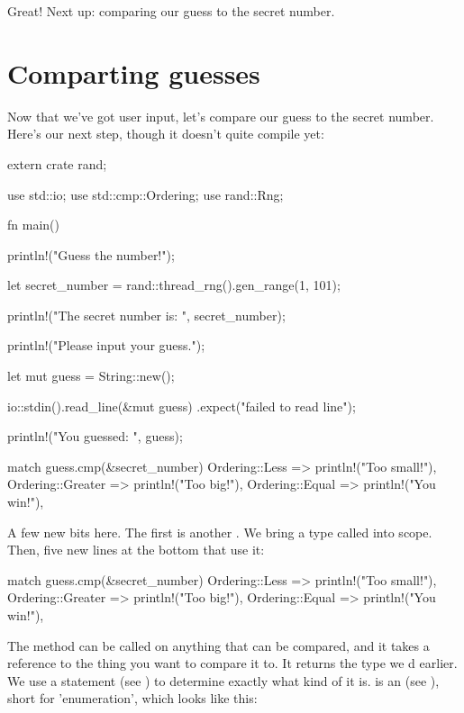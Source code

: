 Great! Next up: comparing our guess to the secret number.

\section{Comparting guesses}

Now that we've got user input, let's compare our guess to the secret number. Here's our next step, though it doesn't quite 
compile yet:

\begin{rustc}
extern crate rand;

use std::io;
use std::cmp::Ordering;
use rand::Rng;

fn main() {
    println!("Guess the number!");

    let secret_number = rand::thread_rng().gen_range(1, 101);

    println!("The secret number is: {}", secret_number);

    println!("Please input your guess.");

    let mut guess = String::new();

    io::stdin().read_line(&mut guess)
        .expect("failed to read line");

    println!("You guessed: {}", guess);

    match guess.cmp(&secret_number) {
        Ordering::Less    => println!("Too small!"),
        Ordering::Greater => println!("Too big!"),
        Ordering::Equal   => println!("You win!"),
    }
}
\end{rustc}

A few new bits here. The first is another . We bring a type called  into scope. Then, five 
new lines at the bottom that use it:

\begin{rustc}
match guess.cmp(&secret_number) {
    Ordering::Less    => println!("Too small!"),
    Ordering::Greater => println!("Too big!"),
    Ordering::Equal   => println!("You win!"),
}
\end{rustc}

The  method can be called on anything that can be compared, and it takes a reference to the thing you want to compare 
it to. It returns the  type we d earlier. We use a  statement (see ) 
to determine exactly what kind of  it is.  is an  (see ), short 
for 'enumeration', which looks like this:

